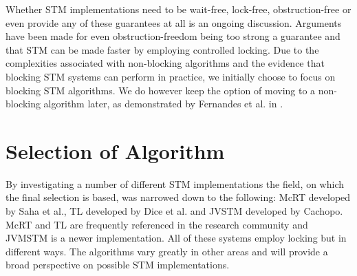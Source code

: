 Whether \ac{STM} implementations need to be wait-free, lock-free, obstruction-free or even provide any of these guarantees at all is an ongoing discussion. Arguments have been made for even obstruction-freedom being too strong a guarantee and that \ac{STM} can be made faster by employing controlled locking\cite{ennals2006software}. Due to the complexities associated with non-blocking algorithms\cite{al2013nonblocking}\cite[p. 61]{herlihy2012art} and the evidence that blocking \ac{STM} systems can perform in practice, we initially choose to focus on blocking \ac{STM} algorithms. We do however keep the option of moving to a non-blocking algorithm later, as demonstrated by Fernandes et al. in \cite{fernandes2011lock}.



\section{Selection of Algorithm}

By investigating a number of different \ac{STM} implementations the field, on which the final selection is based, was narrowed down to the following: McRT\cite{saha2006mcrt} developed by Saha et al., TL\cite{dice2006transactional} developed by Dice et al. and JVSTM\cite{cachopo2007development} developed by Cachopo. McRT and TL are frequently referenced in the research community and JVMSTM is a newer implementation. All of these systems employ locking but in different ways. The algorithms vary greatly in other areas and will provide a broad perspective on possible \ac{STM} implementations.

